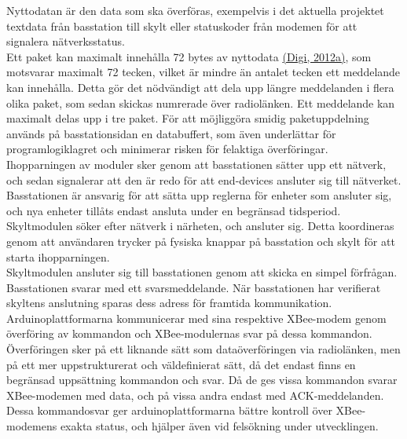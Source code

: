 \documentclass[a4paper,11pt]{article}
\begin{document}
Nyttodatan är den data som ska överföras, exempelvis i det aktuella projektet textdata från basstation till skylt eller statuskoder från modemen för att signalera nätverksstatus. \\

Ett paket kan maximalt innehålla 72 bytes av nyttodata \hyperref[digi]{(Digi, 2012a)}, som motsvarar maximalt 72 tecken, vilket är mindre än antalet tecken ett meddelande kan innehålla. Detta gör det nödvändigt att dela upp längre meddelanden i flera olika paket, som sedan skickas numrerade över radiolänken. Ett meddelande kan maximalt delas upp i tre paket. För att möjliggöra smidig paketuppdelning används på basstationsidan en databuffert, som även underlättar för programlogiklagret och minimerar risken för felaktiga överföringar. \\

Ihopparningen av moduler sker genom att basstationen sätter upp ett nätverk, och sedan signalerar att den är redo för att end-devices ansluter sig till nätverket. Basstationen är ansvarig för att sätta upp reglerna för enheter som ansluter sig, och nya enheter tillåts endast ansluta under en begränsad tidsperiod. Skyltmodulen söker efter nätverk i närheten, och ansluter sig. Detta koordineras genom att användaren trycker på fysiska knappar på basstation och skylt för att starta ihopparningen. \\

Skyltmodulen ansluter sig till basstationen genom att skicka en simpel förfrågan. Basstationen svarar med ett svarsmeddelande. När basstationen har verifierat skyltens anslutning sparas dess adress för framtida kommunikation. \\

Arduinoplattformarna kommunicerar med sina respektive XBee-modem genom överföring av kommandon och XBee-modulernas svar på dessa kommandon. Överföringen sker på ett liknande sätt som dataöverföringen via radiolänken, men på ett mer uppstrukturerat och väldefinierat sätt, då det endast finns en begränsad uppsättning kommandon och svar. Då de ges vissa kommandon svarar XBee-modemen med data, och på vissa andra endast med ACK-meddelanden. Dessa kommandosvar ger arduinoplattformarna bättre kontroll över XBee-modemens exakta status, och hjälper även vid felsökning under utvecklingen. \\
\end{document}
